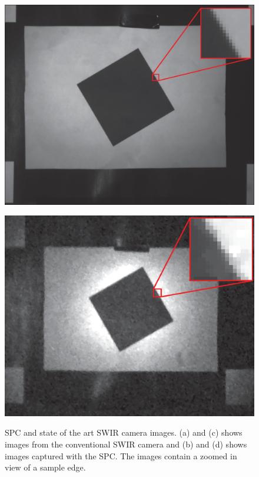 \begin{figure}[H]
\begin{minipage}[t]{0.49\textwidth}
    \includegraphics[width=1\textwidth]{result/mtf/swir12.eps}
    \subcaption{}
    \label{fig:mtf_s1}
\end{minipage}
\begin{minipage}[t]{0.49\textwidth}
    \includegraphics[width=1\textwidth]{result/mtf/spc122.eps}
    \subcaption{}
    \label{fig:mtf_spc1}
\end{minipage}
    \caption{SPC and state of the art SWIR camera images. (a) and (c) shows images from the conventional SWIR camera and (b) and (d) shows images captured with the SPC. The images contain a zoomed in view of a sample edge.}
    \label{fig:mtf_target_im}
\end{figure}




